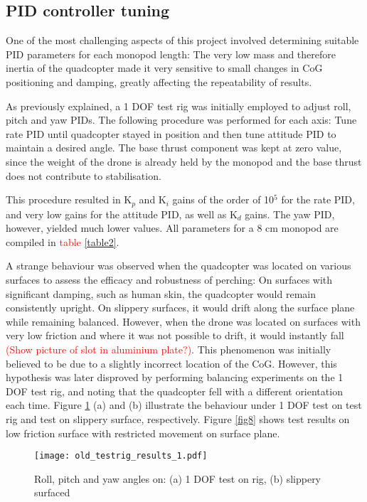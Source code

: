 \documentclass[12pt,a4paper]{article}
\begin{document}
\subsection{PID controller tuning}
One of the most challenging aspects of this project involved determining suitable PID parameters for each monopod length: The very low mass and therefore inertia of the quadcopter made it very sensitive to small changes in CoG positioning and damping, greatly affecting the repeatability of results.

As previously explained, a 1 DOF test rig was initially employed to adjust roll, pitch and yaw PIDs. The following procedure was performed for each axis: Tune rate PID until quadcopter stayed in position and then tune attitude PID to maintain a desired angle. The base thrust component was kept at zero value, since the weight of the drone is already held by the monopod and the base thrust does not contribute to stabilisation.

This procedure resulted in K$_p$ and K$_i$ gains of the order of 10$^5$ for the rate PID, and very low gains for the attitude PID, as well as K$_d$ gains. The yaw PID, however, yielded much lower values. All parameters for a 8 cm monopod are compiled in \textcolor{red}{table \ref{table2}}. 

A strange behaviour was observed when the quadcopter was located on various surfaces to assess the efficacy and robustness of perching: On surfaces with significant damping, such as human skin, the quadcopter would remain consistently upright. On slippery surfaces, it would drift along the surface plane while remaining balanced. However, when the drone was located on surfaces with very low friction and where it was not possible to drift, it would instantly fall \textcolor{red}{(Show picture of slot in aluminium plate?)}. This phenomenon was initially believed to be due to a slightly incorrect location of the CoG. However, this hypothesis was later disproved by performing balancing experiments on the 1 DOF test rig, and noting that the quadcopter fell with a different orientation each time. Figure \ref{fig7} (a) and (b) illustrate the behaviour under 1 DOF test on test rig and test on slippery surface, respectively. Figure \ref{fig8} shows test results on low friction surface with restricted movement on surface plane.


\begin{figure}[h!]
\centering
 \texttt{[image: old\_testrig\_results\_1.pdf]}
  \caption {Roll, pitch and yaw angles on: (a) 1 DOF test on rig, (b) slippery surfaced}
  \label{fig7}
\end{figure}
\end{document}

